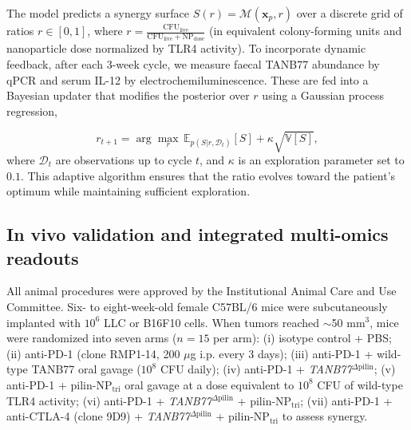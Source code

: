 \documentclass{article}
\begin{document}
The model predicts a synergy surface $S(r) = \mathcal{M}(\mathbf{x}_p, r)$ over a discrete grid of ratios $r \in [0,1]$, where $r = \frac{\text{CFU}_{\text{live}}}{\text{CFU}_{\text{live}} + \text{NP}_{\text{dose}}}$ (in equivalent colony-forming units and nanoparticle dose normalized by TLR4 activity). To incorporate dynamic feedback, after each 3-week cycle, we measure faecal TANB77 abundance by qPCR and serum IL-12 by electrochemiluminescence. These are fed into a Bayesian updater that modifies the posterior over $r$ using a Gaussian process regression,

\begin{equation}
    r_{t+1} = \arg\max_{r} \, \mathbb{E}_{p(S|r,\mathcal{D}_t)}[S] + \kappa \sqrt{\mathbb{V}[S]},
\end{equation}
where $\mathcal{D}_t$ are observations up to cycle $t$, and $\kappa$ is an exploration parameter set to $0.1$. This adaptive algorithm ensures that the ratio evolves toward the patient’s optimum while maintaining sufficient exploration.

\subsection{In vivo validation and integrated multi-omics readouts}

All animal procedures were approved by the Institutional Animal Care and Use Committee. Six- to eight-week-old female C57BL/6 mice were subcutaneously implanted with $10^6$ LLC or B16F10 cells. When tumors reached $\sim$50 mm$^3$, mice were randomized into seven arms ($n=15$ per arm): (i) isotype control + PBS; (ii) anti-PD-1 (clone RMP1-14, 200 $\mu$g i.p. every 3 days); (iii) anti-PD-1 + wild-type TANB77 oral gavage ($10^8$ CFU daily); (iv) anti-PD-1 + \textit{TANB77}$^{\Delta\text{pilin}}$; (v) anti-PD-1 + pilin-NP$_{\text{tri}}$ oral gavage at a dose equivalent to $10^8$ CFU of wild-type TLR4 activity; (vi) anti-PD-1 + \textit{TANB77}$^{\Delta\text{pilin}}$ + pilin-NP$_{\text{tri}}$; (vii) anti-PD-1 + anti-CTLA-4 (clone 9D9) + \textit{TANB77}$^{\Delta\text{pilin}}$ + pilin-NP$_{\text{tri}}$ to assess synergy.
\end{document}
